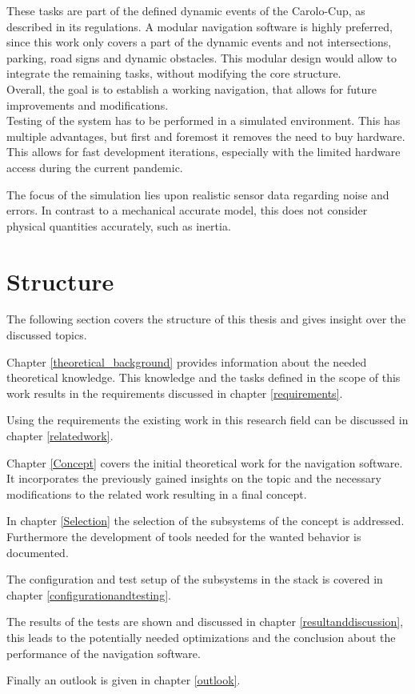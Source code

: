 These tasks are part of the defined dynamic events of the Carolo-Cup, as described in its regulations\cite{carolocup}. A modular navigation software is highly preferred, since this work only covers a part of the dynamic events and not intersections, parking, road signs and dynamic obstacles. This modular design would allow to integrate the remaining tasks, without modifying the core structure.\\

Overall, the goal is to establish a working navigation, that allows for future improvements and modifications.\\

Testing of the system has to be performed in a simulated environment. This has multiple advantages, but first and foremost it removes the need to buy hardware. This allows for fast development iterations, especially with the limited hardware access during the current pandemic.


The focus of the simulation lies upon realistic sensor data regarding noise and errors. In contrast to a mechanical accurate model, this does not consider physical quantities accurately, such as inertia.


\section{Structure}
The following section covers the structure of this thesis and gives insight over the discussed topics.

Chapter \ref{theoretical_background} provides information about the needed theoretical knowledge. This knowledge and the tasks defined in the scope of this work results in the requirements discussed in chapter \ref{requirements}.

Using the requirements the existing work in this research field can be discussed in chapter \ref{relatedwork}.

Chapter \ref{Concept} covers the initial theoretical work for the navigation software. It incorporates the previously gained insights on the topic and the necessary modifications to the related work resulting in a final concept.

In chapter \ref{Selection} the selection of the subsystems of the concept is addressed. Furthermore the development of tools needed for the wanted behavior is documented.

The configuration and test setup of the subsystems in the stack is covered in chapter \ref{configurationandtesting}.


The results of the tests are shown and discussed in chapter \ref{resultanddiscussion}, this leads to the potentially needed optimizations and the conclusion about the performance of the navigation software.

Finally an outlook is given in chapter \ref{outlook}.
